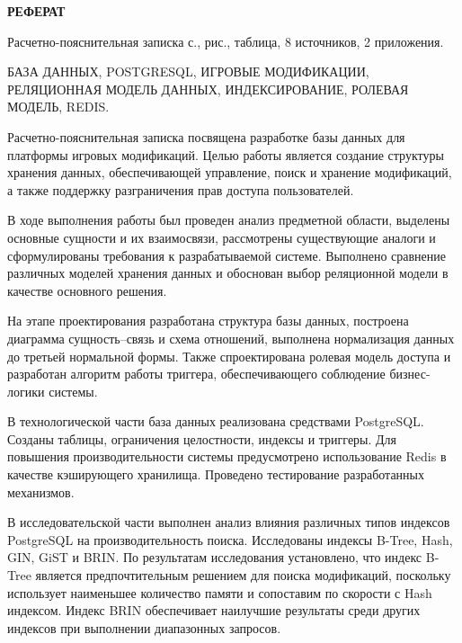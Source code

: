 \begin{center}
	\LARGE\bfseries{РЕФЕРАТ}
\end{center}

Расчетно-пояснительная записка \pageref{LastPage} с., \totalfigures{} рис., \totaltables{} таблица, 8 источников, 2 приложения.

БАЗА ДАННЫХ, POSTGRESQL, ИГРОВЫЕ МОДИФИКАЦИИ, РЕЛЯЦИОННАЯ МОДЕЛЬ ДАННЫХ, ИНДЕКСИРОВАНИЕ, РОЛЕВАЯ МОДЕЛЬ, REDIS.

Расчетно-пояснительная записка посвящена разработке базы данных для платформы игровых модификаций. Целью работы является создание структуры хранения данных, обеспечивающей управление, поиск и хранение модификаций, а также поддержку разграничения прав доступа пользователей.

В ходе выполнения работы был проведен анализ предметной области, выделены основные сущности и их взаимосвязи, рассмотрены существующие аналоги и сформулированы требования к разрабатываемой системе. Выполнено сравнение различных моделей хранения данных и обоснован выбор реляционной модели в качестве основного решения.

На этапе проектирования разработана структура базы данных, построена диаграмма сущность--связь и схема отношений, выполнена нормализация данных до третьей нормальной формы. Также спроектирована ролевая модель доступа и разработан алгоритм работы триггера, обеспечивающего соблюдение бизнес-логики системы.

В технологической части база данных реализована средствами PostgreSQL. Созданы таблицы, ограничения целостности, индексы и триггеры. Для повышения производительности системы предусмотрено использование Redis в качестве кэширующего хранилища. Проведено тестирование разработанных механизмов.

В исследовательской части выполнен анализ влияния различных типов индексов PostgreSQL на производительность поиска. Исследованы индексы B-Tree, Hash, GIN, GiST и BRIN. По результатам исследования установлено, что индекс B-Tree является предпочтительным решением для поиска модификаций, поскольку использует наименьшее количество памяти и сопоставим по скорости с Hash индексом. Индекс BRIN обеспечивает наилучшие результаты среди других индексов при выполнении диапазонных запросов.